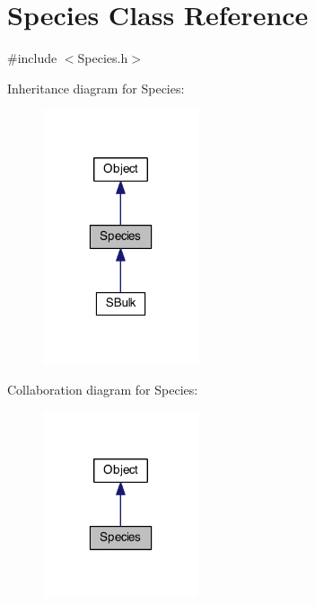 \hypertarget{classSpecies}{\section{Species Class Reference}
\label{classSpecies}
}


{\ttfamily \#include $<$Species.\-h$>$}



Inheritance diagram for Species\-:
\nopagebreak
\begin{figure}[H]
\begin{center}
\leavevmode
\includegraphics[width=130pt]{classSpecies__inherit__graph}
\end{center}
\end{figure}


Collaboration diagram for Species\-:
\nopagebreak
\begin{figure}[H]
\begin{center}
\leavevmode
\includegraphics[width=130pt]{classSpecies__coll__graph}
\end{center}
\end{figure}
